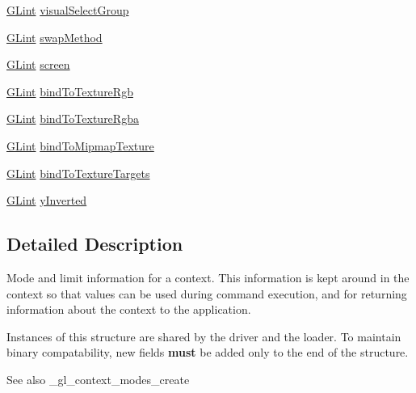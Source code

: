 \begin{DoxyCompactItemize}
\item 
\hyperlink{gl_8h_acebcc1c5663f14ebde1d16831e5fed94}{G\+Lint} \hyperlink{struct_____g_lcontext_modes_rec_aebba29ee5ef91a793639cb6e34b08293}{visual\+Select\+Group}
\item 
\hyperlink{gl_8h_acebcc1c5663f14ebde1d16831e5fed94}{G\+Lint} \hyperlink{struct_____g_lcontext_modes_rec_abd6134da187ba8a624697e79d7085c17}{swap\+Method}
\item 
\hyperlink{gl_8h_acebcc1c5663f14ebde1d16831e5fed94}{G\+Lint} \hyperlink{struct_____g_lcontext_modes_rec_a836b07d07dfd8dd8a0ea2d0c40d9c91b}{screen}
\item 
\hyperlink{gl_8h_acebcc1c5663f14ebde1d16831e5fed94}{G\+Lint} \hyperlink{struct_____g_lcontext_modes_rec_a0b78da528ab404af6412d28510c590dc}{bind\+To\+Texture\+Rgb}
\item 
\hyperlink{gl_8h_acebcc1c5663f14ebde1d16831e5fed94}{G\+Lint} \hyperlink{struct_____g_lcontext_modes_rec_ac57c38455c9e56aea1cdaeca128df694}{bind\+To\+Texture\+Rgba}
\item 
\hyperlink{gl_8h_acebcc1c5663f14ebde1d16831e5fed94}{G\+Lint} \hyperlink{struct_____g_lcontext_modes_rec_a7eff8c9291e6aaafdad738f135e7d9da}{bind\+To\+Mipmap\+Texture}
\item 
\hyperlink{gl_8h_acebcc1c5663f14ebde1d16831e5fed94}{G\+Lint} \hyperlink{struct_____g_lcontext_modes_rec_adab2b492791ac75995954068926c0f20}{bind\+To\+Texture\+Targets}
\item 
\hyperlink{gl_8h_acebcc1c5663f14ebde1d16831e5fed94}{G\+Lint} \hyperlink{struct_____g_lcontext_modes_rec_ad97b5f499fba434f28c42fa4cf60ab0c}{y\+Inverted}
\end{DoxyCompactItemize}


\subsection{Detailed Description}
Mode and limit information for a context. This information is kept around in the context so that values can be used during command execution, and for returning information about the context to the application.

Instances of this structure are shared by the driver and the loader. To maintain binary compatability, new fields {\bfseries must} be added only to the end of the structure.

\begin{DoxySeeAlso}{See also}
\+\_\+gl\+\_\+context\+\_\+modes\+\_\+create 
\end{DoxySeeAlso}


